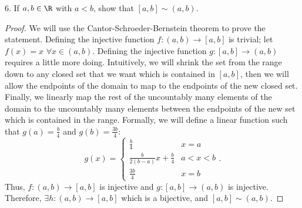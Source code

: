 
6. If $a, b \in \R$ with $a < b$, show that $[a, b] \sim \left( a, b \right) $.

\begin{proof}
	We will use the Cantor-Schroeder-Bernstein theorem to prove the statement. Defining the injective function $f: \left( a, b \right) \to [a, b]$ is trivial; let $f\left( x \right) = x$ $\forall x \in \left( a,b \right) $. Defining the injective function $g: [a, b] \to \left( a, b \right) $ requires a little more doing. Intuitively, we will shrink the set from the range down to any closed set that we want which is contained in $[a, b]$, then we will allow the endpoints of the domain to map to the endpoints of the new closed set. Finally, we linearly map the rest of the uncountably many elements of the domain to the uncountably many elements between the endpoints of the new set which is contained in the range. Formally, we will define a linear function such that $g\left( a \right) = \frac{b}{4}$ and $g\left( b \right) = \frac{3b}{4}$:
	\[
		g\left( x \right) =
		\begin{cases}
			\frac{b}{4} & x = a \\
			\frac{b}{2\left( b - a \right)}x + \frac{b}{4} & a < x < b \\
			\frac{3b}{4} & x = b
		\end{cases}
	.\]
	Thus, $f: \left( a, b \right) \to [a, b]$ is injective and $g: [a, b] \to \left( a, b \right) $ is injective. Therefore, $\exists h: \left( a, b \right) \to [a, b]$ which is a bijective, and $[a, b] \sim \left( a, b \right) $.

\end{proof}
























